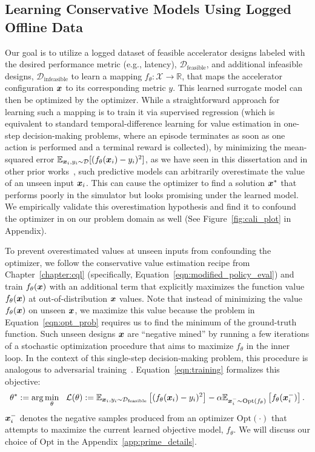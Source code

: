 \subsection{Learning Conservative Models Using Logged Offline Data}
\vspace{-0.2cm}
Our goal is to utilize a logged dataset of feasible accelerator designs labeled with the desired performance metric (e.g., latency),  $\mathcal{D}_\text{feasible}$, and additional infeasible designs, $\mathcal{D}_\text{infeasible}$ to learn a mapping ${f}_\theta: \mathcal{X} \rightarrow \mathbb{R}$, that maps the accelerator configuration ${\boldsymbol{x}}$ to its corresponding metric $y$. This learned surrogate model can then be optimized by the optimizer. While a straightforward approach for learning such a mapping is to train it via supervised regression (which is equivalent to standard temporal-difference learning for value estimation in one-step decision-making problems, where an episode terminates as soon as one action is performed and a terminal reward is collected), by minimizing the mean-squared error $\mathbb{E}_{{\boldsymbol{x}}_i, y_i \sim \mathcal{D}}[(f_\theta({\boldsymbol{x}}_i) - y_i)^2]$, as we have seen in this dissertation and in other prior works~\citep{kumar2019model}, such predictive models can arbitrarily overestimate the value of an unseen input ${\boldsymbol{x}}_i$. This can cause the optimizer to find a solution ${\boldsymbol{x}}^*$ that performs poorly in the simulator but looks promising under the learned model. We empirically validate this overestimation hypothesis and find it to confound the optimizer in on our problem domain as well (See Figure~\ref{fig:cali_plot} in Appendix). 

To prevent overestimated values at unseen inputs from confounding the optimizer, we follow the conservative value estimation recipe from Chapter~\ref{chapter:cql} (specifically, Equation~\ref{eqn:modified_policy_eval}) and train $f_\theta({\boldsymbol{x}})$ with an additional term that explicitly maximizes the function value $f_\theta({\boldsymbol{x}})$ at out-of-distribution ${\boldsymbol{x}}$ values. Note that instead of minimizing the value $f_\theta({\boldsymbol{x}})$ on unseen ${\boldsymbol{x}}$, we maximize this value because the problem in Equation~\ref{eqn:opt_prob} requires us to find the minimum of the ground-truth function. Such unseen designs ${\boldsymbol{x}}$ are ``negative mined'' by running a few iterations of a stochastic optimization procedure that aims to maximize $f_\theta$ in the inner loop. In the context of this single-step decision-making problem, this procedure is analogous to adversarial training~\citep{goodfellow2014explaining}. Equation~\ref{eqn:training} formalizes this objective:
\newcommand{\editcolor}{black}
\begin{equation}
\label{eqn:training}
    \theta^* := \arg \min_\theta~~ \mathcal{L}(\theta):= \E_{\rvx_i, y_i \sim \mathcal{D}_{\text{feasible}}} \left[ (f_\theta(\rvx_i) - y_i)^2 \right] - \alpha \E_{\rvx^{-}_i \sim \textcolor{\editcolor}{\mathrm{Opt}(f_\theta)}} \left[f_\theta(\rvx^-_i) \right].
\end{equation}
${\boldsymbol{x}}^{-}_i$ denotes the negative samples produced from an optimizer $\mathrm{Opt}(\cdot)$ that attempts to maximize the current learned objective model, $f_\theta$. We will discuss our choice of $\mathrm{Opt}$ in the Appendix~\ref{app:prime_details}.  
 
